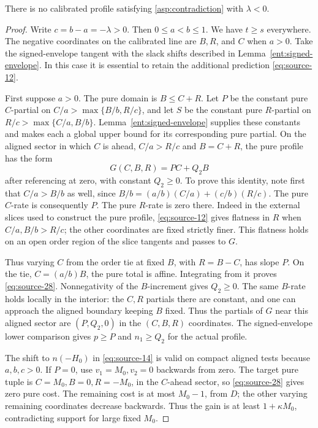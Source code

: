 \begin{proposition}\label{asp:decreasing}
There is no calibrated profile satisfying \eqref{asp:contradiction}
with \(\lambda<0\).
\end{proposition}

\begin{proof}
Write \(c=b-a=-\lambda>0\). Then \(0\le a<b\le1\).
We have \(t\ge s\) everywhere. The negative coordinates on the
calibrated line are \(B,R\), and \(C\) when \(a>0\).
Take the signed-envelope tangent with the slack shifts described in
Lemma~\ref{ent:signed-envelope}. In this case it is essential to
retain the additional prediction \eqref{eq:source-12}.

First suppose \(a>0\). The pure domain is \(B\le C+R\).
Let \(P\) be the constant pure \(C\)-partial on
\(C/a>\max\{B/b,R/c\}\), and let \(S\) be the constant pure
\(R\)-partial on \(R/c>\max\{C/a,B/b\}\).
Lemma~\ref{ent:signed-envelope} supplies these constants and makes each
a global upper bound for its corresponding pure partial.
On the aligned sector in which \(C\) is ahead,
\(C/a>R/c\) and \(B=C+R\), the pure profile has the form
\begin{equation}\label{eq:source-28}
G(C,B,R)=PC+Q_2B
\end{equation}
after referencing at zero, with constant \(Q_2\ge0\).
To prove this identity, note first that \(C/a>B/b\) as
well, since \(B/b=(a/b)(C/a)+(c/b)(R/c)\).
The pure \(C\)-rate is consequently \(P\).
The pure \(R\)-rate is zero there. Indeed in the external slices
used to construct the pure profile, \eqref{eq:source-12}
gives flatness in \(R\) when
\(C/a,B/b>R/c\); the other coordinates are fixed strictly
finer. This flatness holds on an open order region of the slice
tangents and passes to \(G\).

Thus varying \(C\) from the order tie at fixed \(B\), with
\(R=B-C\), has slope \(P\). On the tie,
\(C=(a/b)B\), the pure total is affine. Integrating from it
proves \eqref{eq:source-28}. Nonnegativity of the \(B\)-increment
gives \(Q_2\ge0\). The same \(B\)-rate holds locally in the
interior: the \(C,R\) partials there are constant, and one can
approach the aligned boundary keeping \(B\) fixed.
Thus the partials of \(G\) near this aligned sector are
\((P,Q_2,0)\) in the \((C,B,R)\) coordinates. The signed-envelope
lower comparison gives \(p\ge P\) and \(n_1\ge Q_2\) for the actual
profile.

The shift to \(n(-H_0)\) in \eqref{eq:source-14} is valid
on compact aligned tests because \(a,b,c>0\). If \(P=0\),
use \(v_1=M_0,v_2=0\) backwards from zero. The target pure
tuple is \(C=M_0,B=0,R=-M_0\), in the \(C\)-ahead sector,
so \eqref{eq:source-28} gives zero pure cost. The remaining
cost is at most \(M_0-1\), from \(D\); the other varying
remaining coordinates decrease backwards. Thus the gain is at
least \(1+\kappa M_0\), contradicting support for large fixed
\(M_0\).


\end{proof}

